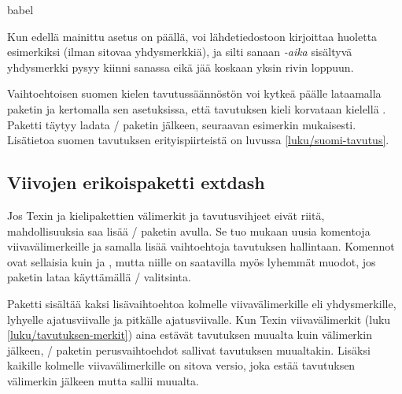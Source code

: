 \begin{koodilohkosis}
\usepackage{main=finnish}{babel}
\end{koodilohkosis}

\noindent
Kun edellä mainittu asetus on päällä, voi lähdetiedostoon kirjoittaa
huoletta esimerkiksi  (ilman sitovaa
yhdysmerkkiä), ja silti sanaan \emph{\mbox{-aika}} sisältyvä yhdysmerkki
pysyy kiinni sanassa eikä jää koskaan yksin rivin loppuun.

Vaihtoehtoisen suomen kielen tavutussäännöstön voi kytkeä päälle
lataamalla paketin  ja kertomalla sen asetuksissa,
että tavutuksen kieli  korvataan kielellä
. Paketti  täytyy ladata
\-/ paketin jälkeen, seuraavan esimerkin mukaisesti.
Lisätietoa suomen tavutuksen erityispiirteistä on luvussa
\ref{luku/suomi-tavutus}.

\begin{koodilohkosis}
\usepackage[main=finnish]{babel}
\usepackage[finnish=schoolfinnish]{hyphsubst}
\end{koodilohkosis}

\subsection{Viivojen erikoispaketti extdash}

Jos Texin ja kielipakettien välimerkit ja tavutusvihjeet eivät riitä,
mahdollisuuksia saa lisää \-/ paketin avulla. Se
tuo mukaan uusia komentoja viivavälimerkeille ja samalla lisää
vaihtoehtoja tavutuksen hallintaan. Komennot ovat sellaisia kuin
 ja , mutta niille on saatavilla myös
lyhemmät muodot, jos paketin lataa käyttämällä \-/
valitsinta.

\begin{koodilohkosis}
\usepackage[shortcuts]{extdash}
\end{koodilohkosis}

\noindent
Paketti sisältää kaksi lisävaihtoehtoa kolmelle viivavälimerkille eli
yhdysmerkille, lyhyelle ajatusviivalle ja pitkälle ajatusviivalle. Kun
Texin viivavälimerkit (luku \ref{luku/tavutuksen-merkit}) aina estävät
tavutuksen muualta kuin välimerkin jälkeen, \-/ paketin
perusvaihtoehdot sallivat tavutuksen muualtakin. Lisäksi kaikille
kolmelle viivavälimerkille on sitova versio, joka estää tavutuksen
välimerkin jälkeen mutta sallii muualta.

